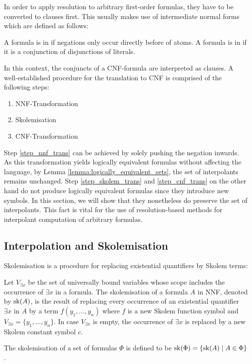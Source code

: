 In order to apply resolution to arbitrary first-order formulas, they have to be converted to clauses first.
This usually makes use of intermediate normal forms which are defined as follows:

\begin{defi}
	A formula is in  if negations only occur directly before of atoms.
	A formula is in  if it is a conjunction of disjunctions of literals.
\end{defi}

In this context, the conjuncts of a CNF-formula are interpreted as clauses.
A well-established procedure for the translation to CNF is comprised of the following steps:

\begin{enumerate}
	\item NNF-Transformation \label{step_nnf_trans}
	\item Skolemisation \label{step_skolem_trans}
	\item CNF-Transformation \label{step_cnf_trans}
\end{enumerate}

Step \ref{step_nnf_trans} can be achieved by solely pushing the negation inwards.
As this transformation yields logically equivalent formulas without affecting the language, by Lemma \ref{lemma:logically_equivalent_sets}, the set of interpolants remains unchanged.
Step \ref{step_skolem_trans} and \ref{step_cnf_trans} on the other hand do not produce logically equivalent formulas since they introduce new symbols.
In this section, we will show that they nonetheless do preserve the set of interpolants.
This fact is vital for the use of resolution-based methods for interpolant computation of arbitrary formulas.


\subsection{Interpolation and Skolemisation}

Skolemisation is a procedure for replacing existential quantifiers by Skolem terms:

\begin{defi}
	Let $V_{\exists x}$ be the set of universally bound variables whose scope includes
	the occurrence of $\exists x$ in a formula.
	The skolemisation of a formula $A$ in NNF, denoted by $\operatorname{sk}(A)$, is the result of replacing every occurrence of an existential quantifier $\exists x$ in $A$ by a term $f(y_1, \ldots, y_n)$ where $f$ is a new Skolem function symbol and $V_{\exists x} = \{y_1, \ldots, y_n\}$.
	In case $V_{\exists x}$ is empty, the occurrence of $\exists x$ is replaced by a new Skolem constant symbol $c$.

	The skolemisation of a set of formulas $\Phi$ is defined to be $\operatorname{sk}(\Phi) = \{ \operatorname{sk}(A) \mid A \in \Phi \}$.
\end{defi}

